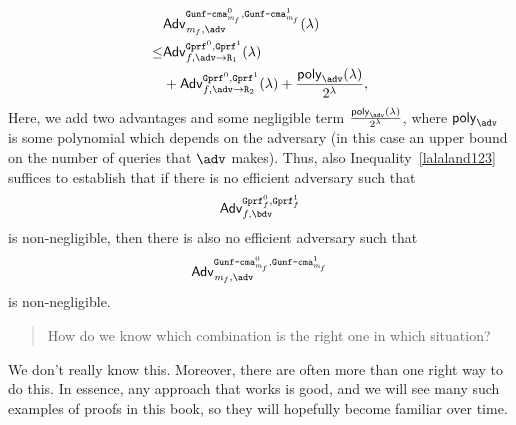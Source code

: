 \begin{align}
      \notag     & \mathsf{Adv}^{\M{Gunf\text{-}cma}_{\m_f}^0,\M{Gunf\text{-}cma}_{\m_f}^1}_{\m_f,\adv}(\lambda)                                            \\
      \notag\leq & \mathsf{Adv}^{\M{Gprf}^0,\M{Gprf}^1}_{f,\adv\rightarrow\M{R}_1}(\lambda)                                                                 \\
                 & \label{lalaland123}+\mathsf{Adv}^{\M{Gprf}^0,\M{Gprf}^1}_{f,\adv\rightarrow\M{R}_2}(\lambda)+\frac{\O{poly}_{\adv}(\lambda)}{2^\lambda},
\end{align}
Here, we add two advantages and some negligible term $\frac{\O{poly}_{\adv}(\lambda)}{2^\lambda}$, where $\O{poly}_{\adv}$ is
some polynomial which depends on the adversary (in this case an upper bound on the number of queries that $\adv$ makes).
Thus, also Inequality~\ref{lalaland123} suffices to establish that if there is no efficient adversary such that
\[\mathsf{Adv}^{\M{Gprf}_f^0,\M{Gprf}_f^1}_{f,\bdv}\] is non-negligible, then there is also no efficient adversary such
that \[\mathsf{Adv}^{\M{Gunf\text{-}cma}_{\m_f}^0,\M{Gunf\text{-}cma}_{\m_f}^1}_{\m_f,\adv}\] is non-negligible.

\begin{quote}
      How do we know which combination is the right one in which situation?
\end{quote}

We don't really know this. Moreover, there are
often more than one right way to do this. In essence, any approach that works is good, and we will see many such
examples of proofs in this book,
so they will hopefully become familiar over time.

